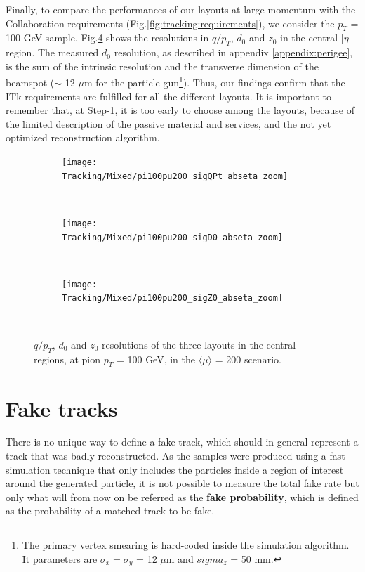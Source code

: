 \documentclass[a4paper,twoside,12pt]{book}
\begin{document}
Finally, to compare the performances of our layouts at large momentum with the Collaboration requirements (Fig.\ref{fig:tracking:requirements}), we consider the $p_{T}$ = 100 GeV sample.
Fig.\ref{fig:tracking:pt100resolutions_zoom} shows the resolutions in $q/p_{T}$, $d_{0}$ and $z_{0}$ in the central
$|\eta|$ region. The measured $d_{0}$ resolution, as described in appendix \ref{appendix:perigee}, is the sum of the intrinsic resolution and the transverse dimension of the beamspot ($\sim$ 12 $\mu$m for the particle gun\footnote{The primary vertex smearing is hard-coded inside the simulation algorithm. It parameters are $\sigma_{x} = \sigma_{y}$ = 12 $\mu$m and $sigma_{z}$ = 50 mm.}). Thus, our findings confirm that the ITk requirements are fulfilled for all the different layouts. It is important to remember that, at Step-1, it is too early to choose among the
layouts, because of the limited description of the passive material and services, and the not yet optimized reconstruction algorithm. \\



\begin{figure}
\begin{subfigure}{\linewidth}
\centering
\texttt{[image: Tracking/Mixed/pi100pu200\_sigQPt\_abseta\_zoom]}
\caption{}
\label{fig:tracking:pi100pu200_sigQPt_abseta_zoom}
\end{subfigure}\\[1ex]
\begin{subfigure}{\linewidth}
\centering
\texttt{[image: Tracking/Mixed/pi100pu200\_sigD0\_abseta\_zoom]}
\caption{}
\label{fig:tracking:pi100pu200_sigD0_abseta_zoom}
\end{subfigure}\\[1ex]
\begin{subfigure}{\linewidth}
\centering
\texttt{[image: Tracking/Mixed/pi100pu200\_sigZ0\_abseta\_zoom]}
\caption{}
\label{fig:tracking:pi100pu200_sigZ0_abseta_zoom}
\end{subfigure}\\[1ex]
\caption{$q/p_{T}$, $d_{0}$ and $z_{0}$ resolutions of the three layouts in the central regions, at pion $p_{T}$ = 100 GeV, in the $\langle\mu\rangle$ = 200 scenario.}
\label{fig:tracking:pt100resolutions_zoom}
\end{figure}


\section{Fake tracks}
There is no unique way to define a fake track, which should in general represent a track that was badly reconstructed. As the samples were produced using a fast simulation technique that
only includes the particles inside a region of interest around the generated particle, it is not possible to measure the total fake rate but only what will from now on be referred
as the \textbf{fake probability}, which is defined as the probability of a matched track to be fake. \\
\end{document}
